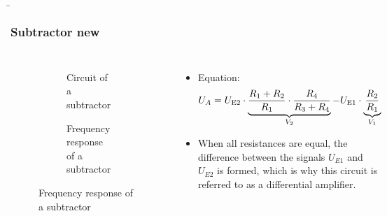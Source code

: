 \begin{frame}
    \b{
    \frametitle{Subtractor new}
    \begin{columns}
        \centering
        \begin{figure}
    \centering

    \begin{subfigure}{\linewidth}
        \centering
        \resizebox{0.6\linewidth}{!}{}
        \caption{Circuit of a subtractor}
    \end{subfigure}

    \vspace{0.5cm} 

    \begin{subfigure}{\linewidth}
        \centering
        \resizebox{0.6\linewidth}{!}{}
        \caption{Frequency response of a subtractor}
    \end{subfigure}

\end{figure}

        \raggedleft
        \begin{itemize}
            \item Equation:
          \[
 {U_A} = {U_{{\textnormal{E2}}}} \cdot \underbrace{ \frac{R_1 + R_2}{R_1} \cdot \frac{R_4}{R_3 + R_4}}_{V_2} - U_{\textnormal{E1}} \cdot \underbrace{\frac{R_2}{R_1}}_{V_1}
          \]
    \item When all resistances are equal, the difference between the signals $U_{E1}$ and $U_{E2}$ is formed, which is why this circuit is referred to as a differential amplifier.
        \end{itemize}
    \end{columns}
    }
\end{frame}



